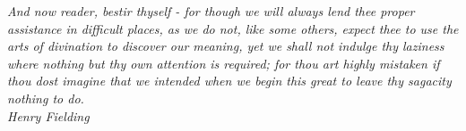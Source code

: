 \vspace*{14cm}
\hspace*{4cm}
\begin{minipage}[b]{12cm}
{\em And now reader, bestir thyself - for though we will always
lend thee proper assistance in difficult places, as we do not,
like some others, expect thee to use the arts of divination to
discover our meaning, yet we shall not indulge thy laziness
where nothing but thy own attention is required; for thou art
highly mistaken if thou dost imagine that we intended when we
begin this great to leave thy sagacity nothing to do. \\
\hspace*{6cm} Henry Fielding}
\end{minipage}

